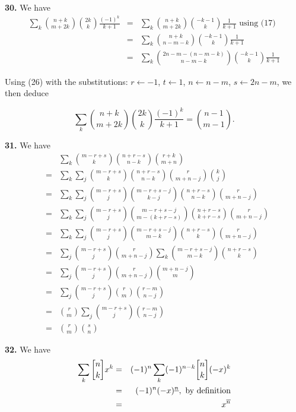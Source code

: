 \documentclass[a4paper,12pt]{article}
\newcommand{\newpar}[1]{\bigskip \noindent \textbf{#1.}}
\newcommand{\stirlingone}[2]{{#1 \atopwithdelims[]#2}}
\newcommand{\la}{\leftarrow}
\begin{document}
\newpar{30}  We have
\begin{eqnarray*}
  \sum_k {n+k \choose m+2k} {2k \choose k} \frac{(-1)^k}{k+1} &=&
  \sum_k {n+k \choose m+2k} {-k-1 \choose k} \frac{1}{k+1}\mbox{ using
    (17)} \\
  &=& \sum_k {n+k \choose n-m -k} {-k-1 \choose k} \frac{1}{k+1} \\
  &=& \sum_k {2n - m - (n-m -k) \choose n-m-k}{-k-1\choose k} \frac{1}{k+1}
\end{eqnarray*}

Using (26) with the substitutions: $r \la -1$, $t \la 1$, $n \la n-m$,
$s \la 2n - m$, we then deduce

\[ \sum_k {n+k \choose m+2k} {2k \choose k} \frac{(-1)^k}{k+1} = {n-1
  \choose m-1}.\]

\newpar{31}  We have
\begin{eqnarray*}
  && \sum_k {m-r+s \choose k} {n+r-s \choose n-k} {r+k \choose
    m+n}\\
  &=& \sum_k \sum_j {m-r+s \choose k} {n+r-s \choose n-k}{r
    \choose m+n -j}{k \choose j} \\
  &=& \sum_k \sum_j {m-r+s \choose
    j}{m-r+s-j \choose k-j} {n+r-s \choose n-k} {r \choose m+n -j} \\
  &=& \sum_k \sum_j {m-r+s \choose j} {m-r+s -j \choose m-(k+r-s)}{n+r-s
    \choose k+r-s} {r \choose m+n - j} \\
  &=& \sum_k \sum_j {m-r+s \choose j} {m-r+s - j \choose m-k} {n+r-s
    \choose k} {r \choose m+n -j } \\
  &=& \sum_j {m-r+s \choose j} {r \choose m+n -j} \sum_k {m-r+s -j
    \choose m-k} {n+r-s \choose k} \\
  &=& \sum_j {m-r+s \choose j} {r \choose m+n - j} {m + n - j \choose
    m} \\
  &=& \sum_j {m-r + s \choose j} {r \choose m} {r -m \choose n - j} \\
  &=& {r \choose m} \sum_j {m-r+s \choose j} {r-m \choose n-j} \\
  &=& {r \choose m} {s \choose n}
\end{eqnarray*}

\newpar{32} We have
\begin{eqnarray*}
  \sum_k \stirlingone{n}{k} x^k &=& (-1)^n \sum_k
  (-1)^{n-k}\stirlingone{n}{k} (-x)^k \\
  &=& (-1)^n (-x)^{\underline{n}}, \mbox{ by definition} \\
  &=& x^{\overline{n}}
\end{eqnarray*}
\end{document}
